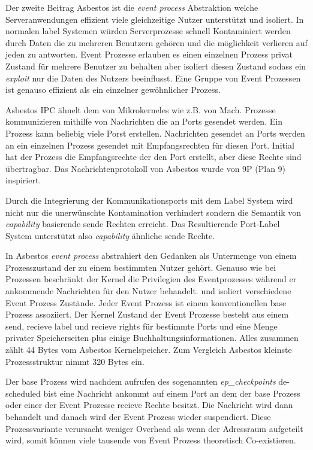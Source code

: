 \documentclass[9pt,technote]{IEEEtran}
\begin{document}
      Der zweite Beitrag Asbestos ist die \textit{event process} Abstraktion welche Serveranwendungen 
      effizient viele gleichzeitige Nutzer unterst\"utzt und isoliert.
      In normalen label Systemen w\"urden Serverprozesse schnell Kontaminiert werden durch Daten die zu mehreren Benutzern 
      geh\"oren und die m\"oglichkeit verlieren auf jeden 
      zu antworten. Event Prozesse erlauben es einen einzelnen Prozess privat Zustand f\"ur mehrere Benutzer zu behalten aber isoliert diesen Zustand sodass ein \textit{exploit}
      nur die Daten des Nutzers beeinflusst. Eine Gruppe von Event Prozessen ist genauso effizient als ein einzelner gew\"ohnlicher Prozess. 
      \cite[S. 1]{inproc:asbestos}
      
      Asbestos IPC \"ahnelt dem von Mikrokerneles wie z.B. von Mach. Prozesse kommunizieren mithilfe von Nachrichten die an Ports gesendet werden. Ein Prozess kann
      beliebig viele Porst erstellen. Nachrichten gesendet an Ports werden an ein einzelnen Prozess gesendet mit Empfangsrechten f\"ur diesen Port. 
      Initial hat der Prozess
      die Empfangsrechte der den Port erstellt, aber diese Rechte sind \"ubertragbar. Das Nachrichtenprotokoll von Asbestos wurde von 9P (Plan 9) inspiriert.
      
      
      Durch die Integrierung der Kommunikationsports mit dem Label System wird nicht nur die unerw\"unschte Kontamination verhindert sondern die Semantik von
      \textit{capability} basierende
      sende Rechten erreicht. Das Resultierende Port-Label System unterst\"utzt also \textit{capability} \"ahnliche sende Rechte.
      
      In Asbestos \textit{event process} abstrahiert den Gedanken als Untermenge von einem Prozesszustand der zu einem bestimmten Nutzer geh\"ort.
      Genauso wie bei Prozessen beschr\"ankt der Kernel
      die Privilegien des Eventprozesses w\"ahrend er ankommende Nachrichten f\"ur den Nutzer behandelt. und isoliert verschiedene Event Prozess Zust\"ande.
      Jeder Event Prozess ist einem konventionellen base Prozess assoziiert. Der Kernel Zustand der Event Prozesse besteht aus einem send, 
      recieve label und recieve rights f\"ur bestimmte Ports
      und eine Menge privater Speicherseiten plus einige Buchhaltungsinformationen. Alles zusammen z\"ahlt 44 Bytes vom Asbestos Kernelspeicher. 
      Zum Vergleich Asbestos kleinste Prozessstruktur
      nimmt 320 Bytes ein. 
      
      Der base Prozess wird nachdem aufrufen des sogenannten \textit{ep\_checkpoints} de-scheduled bist eine Nachricht ankommt 
      auf einem Port an dem der base Prozess oder einer der
      Event Prozesse recieve Rechte besitzt. Die Nachricht wird dann behandelt und danach wird der Event Prozess wieder suspendiert.
      Diese Prozessvariante verursacht weniger Overhead als wenn der Adressraum aufgeteilt wird,
      somit k\"onnen viele tausende von Event Prozess theoretisch Co-existieren.
      
\end{document}
